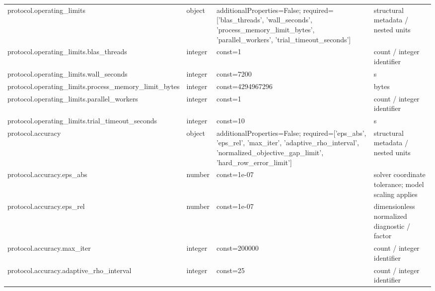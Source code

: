 \begin{longtable}{@{}>{\raggedright\arraybackslash}p{}>{\raggedright\arraybackslash}p{}>{\raggedright\arraybackslash}p{}>{\raggedright\arraybackslash}p{}@{}}
protocol.\allowbreak{}operating\_\allowbreak{}limits & object & additionalProperties=\allowbreak{}False; required=\allowbreak{}['blas\_\allowbreak{}threads', 'wall\_\allowbreak{}seconds', 'process\_\allowbreak{}memory\_\allowbreak{}limit\_\allowbreak{}bytes', 'parallel\_\allowbreak{}workers', 'trial\_\allowbreak{}timeout\_\allowbreak{}seconds'] & structural metadata /\allowbreak{} nested units\\
protocol.\allowbreak{}operating\_\allowbreak{}limits.\allowbreak{}blas\_\allowbreak{}threads & integer & const=\allowbreak{}1 & count /\allowbreak{} integer identifier\\
protocol.\allowbreak{}operating\_\allowbreak{}limits.\allowbreak{}wall\_\allowbreak{}seconds & integer & const=\allowbreak{}7200 & s\\
protocol.\allowbreak{}operating\_\allowbreak{}limits.\allowbreak{}process\_\allowbreak{}memory\_\allowbreak{}limit\_\allowbreak{}bytes & integer & const=\allowbreak{}4294967296 & bytes\\
protocol.\allowbreak{}operating\_\allowbreak{}limits.\allowbreak{}parallel\_\allowbreak{}workers & integer & const=\allowbreak{}1 & count /\allowbreak{} integer identifier\\
protocol.\allowbreak{}operating\_\allowbreak{}limits.\allowbreak{}trial\_\allowbreak{}timeout\_\allowbreak{}seconds & integer & const=\allowbreak{}10 & s\\
protocol.\allowbreak{}accuracy & object & additionalProperties=\allowbreak{}False; required=\allowbreak{}['eps\_\allowbreak{}abs', 'eps\_\allowbreak{}rel', 'max\_\allowbreak{}iter', 'adaptive\_\allowbreak{}rho\_\allowbreak{}interval', 'normalized\_\allowbreak{}objective\_\allowbreak{}gap\_\allowbreak{}limit', 'hard\_\allowbreak{}row\_\allowbreak{}error\_\allowbreak{}limit'] & structural metadata /\allowbreak{} nested units\\
protocol.\allowbreak{}accuracy.\allowbreak{}eps\_\allowbreak{}abs & number & const=\allowbreak{}1e-07 & solver coordinate tolerance; model scaling applies\\
protocol.\allowbreak{}accuracy.\allowbreak{}eps\_\allowbreak{}rel & number & const=\allowbreak{}1e-07 & dimensionless normalized diagnostic /\allowbreak{} factor\\
protocol.\allowbreak{}accuracy.\allowbreak{}max\_\allowbreak{}iter & integer & const=\allowbreak{}200000 & count /\allowbreak{} integer identifier\\
protocol.\allowbreak{}accuracy.\allowbreak{}adaptive\_\allowbreak{}rho\_\allowbreak{}interval & integer & const=\allowbreak{}25 & count /\allowbreak{} integer identifier\\

\end{longtable}
